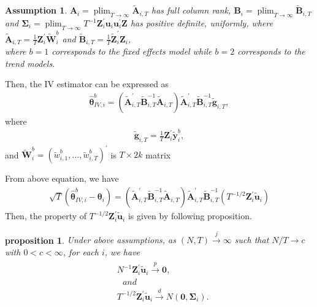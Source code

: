 \documentclass[12pt,a4paper,hyperref]{article}
\newtheorem{myProp}{proposition}
\newtheorem{myAssu}{Assumption}
\DeclareMathOperator*{\plim}{plim}
\begin{document}
\begin{myAssu}
$\boldsymbol{A}_{i}=\plim_{T \to \infty}\tilde{\boldsymbol{A}}_{i,T}$ has full column rank, $\boldsymbol{B}_{i}=\plim_{T \to \infty}\tilde{\boldsymbol{B}}_{i,T}$ and $\boldsymbol{\Sigma}_{i}=\plim_{T \to \infty} T^{-1}\boldsymbol{Z}^{'}_{i}\boldsymbol{u}_{i} \boldsymbol{u}_{i}^{'}\boldsymbol{Z}$ has positive definite, uniformly, where $\tilde{\boldsymbol{A}}_{i,T}= \frac{1}{T}\boldsymbol{Z}^{'}_{i}\tilde{\boldsymbol{W}}^{b}_{i}$ and $\tilde{\boldsymbol{B}}_{i,T}= \frac{1}{T}\tilde{\boldsymbol{Z}}^{'}_{i}\boldsymbol{Z}_{i}$, \\
where $b = 1$ corresponds to the fixed effects model while $b = 2$ corresponds to the trend models.
\end{myAssu}

Then, the IV estimator can be expressed as
\begin{align}
\boldsymbol{\hat{\theta}}^{b}_{IV,i}=\left(\tilde{\boldsymbol{A}}_{i,T}^{'}\tilde{\boldsymbol{B}}_{i,T}^{-1}\tilde{\boldsymbol{A}}_{i,T} \right)\tilde{\boldsymbol{A}}_{i,T}^{'}\tilde{\boldsymbol{B}}_{i,T}^{-1}\tilde{\boldsymbol{g}}_{i,T},
\end{align}
where
\begin{align}
\tilde{\boldsymbol{g}}_{i,T}=\frac{1}{T}\boldsymbol{Z}^{'}_{i}\tilde{\boldsymbol{y}}^{b}_{i},
\end{align}
 and $\tilde{\boldsymbol{W}}^{b}_{i}=\left( \tilde{w}^{b}_{i,1},\ldots, \tilde{w}^{b}_{i,T} \right)^{'}$ is $T \times 2k$ matrix

From above equation, we have
\begin{align}
\sqrt{T}\left(\boldsymbol{\hat{\theta}}^{b}_{IV,i}-\boldsymbol{\theta}_{i} \right)=\left(\tilde{\boldsymbol{A}}_{i,T}^{'}\tilde{\boldsymbol{B}}_{i,T}^{-1}\tilde{\boldsymbol{A}}_{i,T} \right)\tilde{\boldsymbol{A}}_{i,T}^{'}\tilde{\boldsymbol{B}}_{i,T}^{-1}\left(T^{-1/2}  \boldsymbol{Z}^{'}_{i}\tilde{\boldsymbol{u}}_{i} \right)
\end{align}
Then, the property of $T^{-1/2}  \boldsymbol{Z}^{'}_{i}\tilde{\boldsymbol{u}}_{i} $ is given by following proposition.\\
\begin{myProp}
Under above assumptions, as $\left(N, T \right)\overset{j}{\to} \infty$ such that $N/T \to c$ with $0 < c<\infty $, for each $i$, we have
\begin{align}
\begin{split}
&N^{-1} \boldsymbol{Z}^{'}_{i}\tilde{\boldsymbol{u}}_{i}\overset{p}{\to} \boldsymbol{0},  \\
&\,\,\,\,and\,\,\,\,\, \\
&T^{-1/2}  \boldsymbol{Z}^{'}_{i}\tilde{\boldsymbol{u}}_{i} \overset{d}{\to} N\left(\boldsymbol{0},\boldsymbol{\Sigma}_{i} \right).
\end{split}
\end{align}
\end{myProp}
\end{document}

